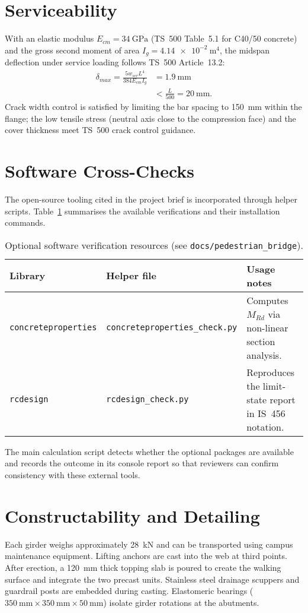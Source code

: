 \documentclass[12pt,a4paper]{report}
\newenvironment{calculation}{\begin{equation}\begin{aligned}}{\end{aligned}\end{equation}}
\begin{document}
\section{Serviceability}
With an elastic modulus $E_{cm}=\SI{34}{\giga\pascal}$ (TS~500 Table~5.1 for C40/50 concrete) and the gross second moment of area $I_g = \SI{4.14e-2}{\meter^4}$, the midspan deflection under service loading follows TS~500 Article~13.2:
\begin{calculation}
\delta_{max} = \frac{5 w_{ser} L^4}{384 E_{cm} I_g} &= \SI{1.9}{\milli\meter} \\
&< \frac{L}{500} = \SI{20}{\milli\meter}.
\end{calculation}
Crack width control is satisfied by limiting the bar spacing to \SI{150}{\milli\meter} within the flange; the low tensile stress (neutral axis close to the compression face) and the cover thickness meet TS~500 crack control guidance.

\section{Software Cross-Checks}\label{sec:software}

The open-source tooling cited in the project brief is incorporated through helper scripts. Table~\ref{tab:software} summarises the available verifications and their installation commands.

\begin{table}[h]
\centering
\begin{tabular}{lll}
\toprule
Library & Helper file & Usage notes \\
\midrule
\texttt{concreteproperties} & \texttt{concreteproperties\_check.py} & Computes $M_{Rd}$ via non-linear section analysis. \\
\texttt{rcdesign} & \texttt{rcdesign\_check.py} & Reproduces the limit-state report in IS~456 notation. \\
\bottomrule
\end{tabular}
\caption{Optional software verification resources (see \texttt{docs/pedestrian\_bridge}).}
\label{tab:software}
\end{table}

The main calculation script detects whether the optional packages are available and records the outcome in its console report so that reviewers can confirm consistency with these external tools.

\section{Constructability and Detailing}
Each girder weighs approximately \SI{28}{\kilo\newton} and can be transported using campus maintenance equipment. Lifting anchors are cast into the web at third points. After erection, a \SI{120}{\milli\meter} thick topping slab is poured to create the walking surface and integrate the two precast units. Stainless steel drainage scuppers and guardrail posts are embedded during casting. Elastomeric bearings ($\SI{350}{\milli\meter}\times\SI{350}{\milli\meter}\times\SI{50}{\milli\meter}$) isolate girder rotations at the abutments.
\end{document}
